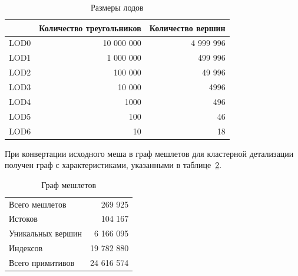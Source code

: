 \begin{table}[h]
    \centering
    \caption{Размеры лодов}

    \begin{tabular}{lrr}
        \hline \hline
        & Количество треугольников
        & Количество вершин \\ \hline
        LOD0 & 10 000 000 & 4 999 996 \\
        LOD1 &  1 000 000 &   499 996 \\
        LOD2 &    100 000 &    49 996 \\
        LOD3 &     10 000 &      4996 \\
        LOD4 &       1000 &       496 \\
        LOD5 &        100 &        46 \\
        LOD6 &         10 &        18 \\
        \hline \hline
    \end{tabular}

    \label{tab:lod-sizes}
\end{table}

При конвертации исходного меша в граф мешлетов для кластерной детализации получен граф с характеристиками, указанными в таблице~\ref{tab:graph-sizes}.

\begin{table}[h]
    \centering
    \caption{Граф мешлетов}

    \begin{tabular}{lr}
        \hline \hline
        Всего мешлетов    &    269 925 \\
        Истоков           &    104 167 \\
        Уникальных вершин &  6 166 095 \\
        Индексов          & 19 782 880 \\
        Всего примитивов  & 24 616 574 \\
        \hline \hline
    \end{tabular}

    \label{tab:graph-sizes}
\end{table}


